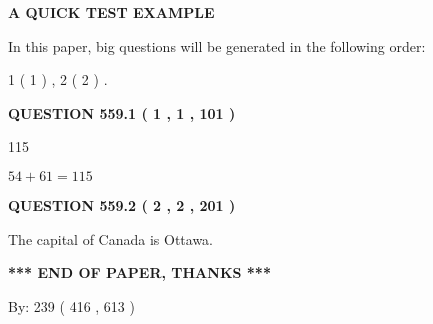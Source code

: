 \documentclass[12pt]{article}
\begin{document}
   
\vspace{0.2in}
   
   
   
   
   
   
 \vspace{0.2in}
{\LARGE {\textbf{ A QUICK TEST EXAMPLE}}}
   
   
   
\vspace{0.2in}
   
In this paper, big questions will be generated in the following order: 
   
   
   1 ( 1 )
 ,
   2 ( 2 )
 .
  
\vspace{0.2in}
  
{\textbf{\Large{QUESTION
559.1 
 ( 1 , 1 , 101 )
}}}
  
  
 
 
\noindent{}

115
 
 
 
 
\noindent{}

$ %
54 +  %
61=   %
115$
 
 
  
\vspace{0.2in}
  
{\textbf{\Large{QUESTION
559.2 
 ( 2 , 2 , 201 )
}}}
  
  
 
 
\noindent{}
 
 
The capital of Canada is Ottawa.
 
 
 
 
   
   
 \vspace{0.2in}
 
   
   
   
   
\vspace{1.0in} 
{\textbf{\large{ *** END OF PAPER, THANKS *** }}} 
   
   
\hspace{1.0in} By: 
 239 ( 416 ,  613 )
   
   
   
\end{document}
